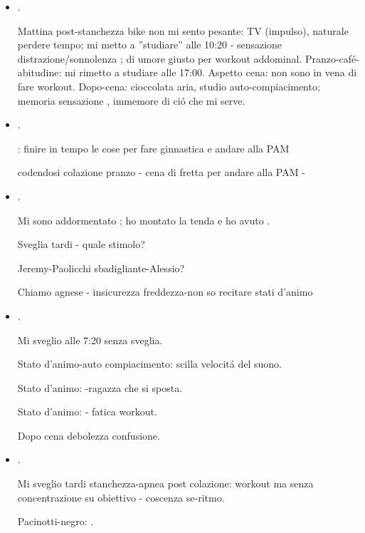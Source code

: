 \begin{itemize}
\item {}.

Mattina post-stanchezza bike non mi sento pesante: TV (impulso), naturale perdere tempo; mi metto a ''studiare'' alle 10:20 - sensazione distrazione/sonnolenza ; di umore giusto per workout addominal. Pranzo-caf\'e-abitudine: mi rimetto a studiare alle 17:00. Aspetto cena: non sono in vena di fare workout. Dopo-cena: cioccolata aria, studio auto-compiacimento; memoria sensazione , immemore di ci\'o che mi serve.

\item {}.

: finire in tempo le cose per fare ginnastica e andare alla PAM

codendosi colazione pranzo - cena di fretta per andare alla PAM - 

\item {}.

Mi sono addormentato ; ho montato la tenda e ho avuto .

Sveglia tardi - quale stimolo?

Jeremy-Paolicchi sbadigliante-Alessio?

Chiamo agnese - insicurezza freddezza-non so recitare stati d'animo

\item {}.

Mi sveglio alle 7:20 senza sveglia.

Stato d'animo-auto compiacimento: scilla velocit\'a del suono.

Stato d'animo: -ragazza che si sposta.

Stato d'animo:  - fatica workout.

Dopo cena debolezza confusione.

\item {}.

Mi sveglio tardi stanchezza-apnea post colazione: workout ma senza concentrazione su obiettivo - coscenza se-ritmo.

Pacinotti-negro: .


\end{itemize}
